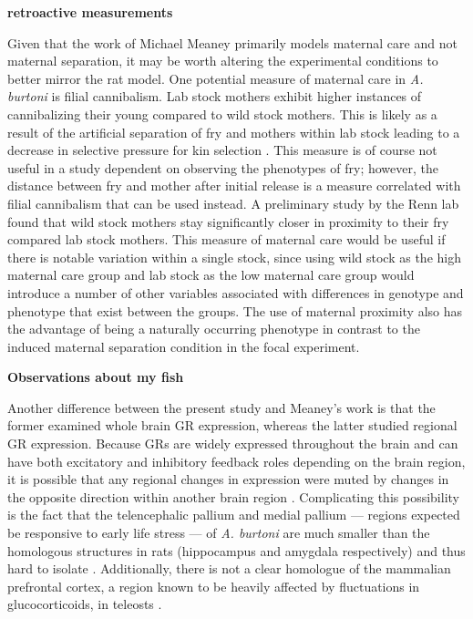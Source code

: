 \documentclass[12pt,twoside]{reedthesis}
\begin{document}
\textbf{retroactive measurements}

Given that the work of Michael Meaney primarily models maternal care and not
maternal separation, it may be worth altering the experimental conditions to
better mirror the rat model. One potential measure of maternal care in
\textit{A. burtoni} is filial cannibalism. Lab stock mothers exhibit higher
instances of cannibalizing their young compared to wild stock mothers. This is likely as
a result of the artificial separation of fry and mothers within lab stock
leading to a
decrease in selective pressure for kin selection \citep{renn_maternal_2009, lonstein_sensory_2002}. This measure is of course not useful
in a study dependent on observing the phenotypes of fry; however, the distance between fry and mother after initial
release is a measure correlated with filial cannibalism that can be used instead. A preliminary study by the
Renn lab found that wild stock mothers stay significantly closer in proximity to their
fry compared lab stock mothers. This measure of maternal care would be useful if
there is notable variation within a single stock, since using wild stock
as the high maternal care group and lab stock as the low maternal care group
would introduce a number of other variables associated with differences in genotype and phenotype that
exist between the groups. The use of maternal proximity also has the advantage of being a naturally
occurring phenotype in contrast to the induced maternal
separation condition in the focal experiment. 

\textbf{Observations about my fish}

Another difference between the present study and Meaney's work is that the
former examined whole brain GR expression, whereas the latter studied regional
GR expression. Because GRs are widely expressed throughout the brain and can
have both excitatory and inhibitory feedback roles depending on the brain
region, it is possible that any regional changes in expression were muted by
changes in the opposite direction within another brain region \citep{2017Nrid,
  herman_limbic_2005}. Complicating this possibility is the fact that the telencephalic pallium and medial
pallium --- regions expected be responsive to early life stress --- of
\textit{A. burtoni} are much smaller than the homologous structures in rats
(hippocampus and amygdala respectively) and thus hard to isolate \citep{salas_neuropsychology_2006}. Additionally,
there is not a clear homologue of the mammalian prefrontal cortex, a region
known to be heavily affected by fluctuations in glucocorticoids, in teleosts
\citep{lupien_effects_2009, yamamoto_studies_2009}. 
\end{document}
